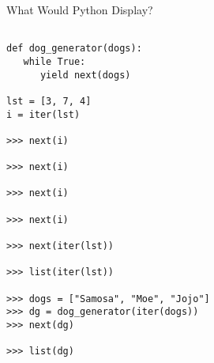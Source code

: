 \begin{blocksection}
\question What Would Python Display?
\begin{lstlisting}

def dog_generator(dogs):
   while True:
      yield next(dogs)
 
lst = [3, 7, 4]
i = iter(lst)

>>> next(i)

>>> next(i)

>>> next(i)

>>> next(i)

>>> next(iter(lst))

>>> list(iter(lst))

>>> dogs = ["Samosa", "Moe", "Jojo"]
>>> dg = dog_generator(iter(dogs))
>>> next(dg)

>>> list(dg)

\end{lstlisting}
\end{blocksection}